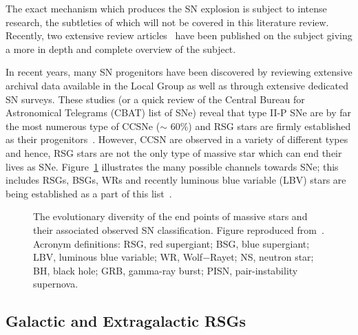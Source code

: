 \documentclass[a4paper,12pt]{article}
\begin{document}
The exact mechanism which produces the SN explosion is subject to intense research, the subtleties of which will not be covered in this literature review. 
Recently, two extensive review articles~\citep{Janka12, Burrows13} have been published on the subject giving a more in depth and complete overview of the subject.

In recent years, many SN progenitors have been discovered by reviewing extensive archival data available in the Local Group as well as through extensive dedicated SN surveys.
These studies (or a quick review of the Central Bureau for Astronomical Telegrams (CBAT) list of SNe\footnotemark) reveal that type II-P SNe are by far the most numerous type of CCSNe ($\sim$ 60\%) and RSG stars are firmly established as their progenitors~\citep[][and references therein]{Smartt09}.
However, CCSN are observed in a variety of different types and hence, RSG stars are not the only type of massive star which can end their lives as SNe. 
Figure~\ref{SNe-Smartt} illustrates the many possible channels towards SNe; this includes RSGs, BSGs, WRs and recently luminous blue variable (LBV) stars are being established as a part of this list~\citep[e.g.][]{Smartt09, Groh13}.

\begin{figure}
  \begin{center}
  \epsfxsize=150mm         %
  \caption{The evolutionary diversity of the end points of massive stars and their associated observed SN classification. Figure reproduced from~\cite{Smartt09}. Acronym definitions: RSG, red supergiant; BSG, blue supergiant; LBV, luminous blue variable; WR, Wolf$-$Rayet; NS, neutron star; BH, black hole; GRB, gamma-ray burst; PISN, pair-instability supernova.}
    \label{SNe-Smartt}
    \end{center}
 \end{figure}

\subsection{Galactic and Extragalactic RSGs}\label{properties}
\end{document}
